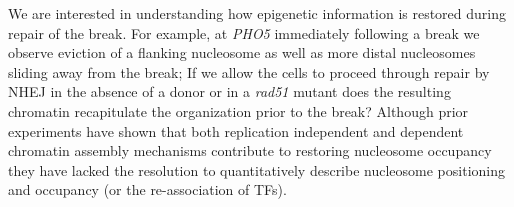 We are interested in understanding how epigenetic information is restored during repair of the break. %
For example, at \textit{PHO5} immediately following a break we observe eviction of a flanking nucleosome as well as more distal nucleosomes sliding away from the break; 
If we %
allow the cells to proceed through repair by NHEJ in the absence of a donor or in a \textit{rad51} mutant does the resulting chromatin recapitulate the organization prior to the break? Although prior experiments have shown that both replication independent and dependent chromatin assembly mechanisms contribute to restoring nucleosome occupancy\citep{Li2016}
they have lacked the resolution to quantitatively describe nucleosome positioning and occupancy (or the re-association of TFs).
  
